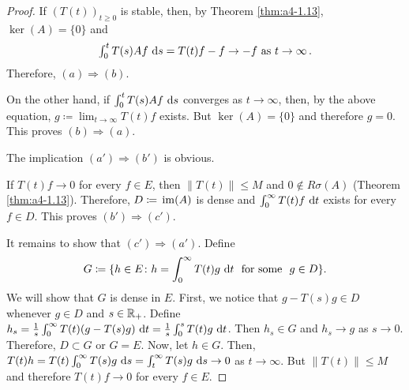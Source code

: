 \begin{proof}
If $(T(t))_{t \geq 0}$ is stable, then, by Theorem \ref{thm:a4-1.13}, $\ker(A) = \{0\}$ and
\[\textstyle{
\int_{0}^{t} T(s)Af \,\mathop{}\!\mathrm{d}{s}= T(t)f - f \to -f \ \text{as} \ t \to \infty\,.
}\]
Therefore, $(a) \Rightarrow (b)$.

On the other hand, if $\int_{0}^{t} T(s)Af \,\mathop{}\!\mathrm{d}{s}$ converges as $t \to \infty$, then, by
the above equation, $g \coloneqq \lim_{t \to \infty} T(t)f$ exists. 
But $\ker(A) = \{0\}$ and
therefore $g = 0$. 
This proves $(b) \Rightarrow (a)$.

The implication $(a') \Rightarrow (b')$ is obvious. 

If $T(t)f \to 0$ for every $f \in E$, then $\|T(t)\| \leq M$ and $0 \not\in R\sigma(A)$ (Theorem \ref{thm:a4-1.13}). 
Therefore,
$D \coloneqq \mathop{}\mathrm{im}(A)$ is dense and $\int_{0}^{\infty} T(t)f \,\mathop{}\!\mathrm{d}{t}$ exists for every $f \in D$. 
This proves $(b') \Rightarrow (c')$. 

It remains to show that $(c') \Rightarrow (a')$.
Define 
\[
G \coloneqq \{h \in E \colon h = \int_{0}^{\infty} T(t)g \,\mathop{}\!\mathrm{d}{t} \ \text{ for some } \ g \in D\}.
\] 
We will show that $G$ is dense in $E$. 
First, we notice that $g - T(s)g \in D$ whenever $g \in D$
and $s \in \mathbb{R}_{+}$.
Define $h_{s} = \frac{1}{s} \int_{0}^{\infty} T(t)(g - T(s)g) \,\mathop{}\!\mathrm{d}{t} = \frac{1}{s} \int_{0}^{s} T(t)g \,\mathop{}\!\mathrm{d}{t}$. 
Then $h_{s} \in G$
and $h_{s} \to g$ as $s \to 0$. 
Therefore, $D \subset G$ or $G = E$. 
Now, let $h \in G$.
Then, $T(t)h = T(t) \int_{0}^{\infty} T(s)g \,\mathop{}\!\mathrm{d}{s} = \int_{t}^{\infty} T(s)g \,\mathop{}\!\mathrm{d}{s} \to 0$ as $t \to \infty$. 
But $\|T(t)\| \leq M$ and therefore $T(t)f \to 0$ for every $f \in E$.
\end{proof}

